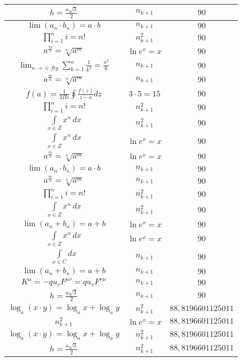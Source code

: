 \documentclass{article}
\begin{document}
\begin{flushleft}
\begin{longtable}{|c|c|c|}
$h=\frac{a\sqrt{3}}{2}$ & $n_{k+1}$ & $90$ \\ \hline 
$\lim\left(a_n\cdot b_n\right)=a\cdot b$ & $n_{k+1}$ & $90$ \\ \hline 
$\prod_{i=1}^ni=n!$ & $n_{k+1}^2$ & $90$ \\ \hline 
$a^{\frac{m}{n}}=\sqrt[n]{a^{m}}$ & $\ln e^x=x$ & $90$ \\ \hline 
$\lim_{n\to\in fty}\sum_{k=1}^n\frac{1}{k^2}=\frac{\pi^2}{6}$ & $n_{k+1}$ & $90$ \\ \hline 
$a^{\frac{m}{n}}=\sqrt[n]{a^{m}}$ & $n_{k+1}$ & $90$ \\ \hline 
$f\left(a\right)=\frac{1}{2\Pi i}\oint\frac{f\left(z\right)}{z-a}dz$ & $3\cdot 5=15$ & $90$ \\ \hline 
$\prod_{i=1}^ni=n!$ & $n_{k+1}^2$ & $90$ \\ \hline 
$\int \limits_{x\in Z}\!x^{n}\,dx$ & $n_{k+1}^2$ & $90$ \\ \hline 
$\int \limits_{x\in Z}\!x^{n}\,dx$ & $\ln e^x=x$ & $90$ \\ \hline 
$a^{\frac{m}{n}}=\sqrt[n]{a^{m}}$ & $\ln e^x=x$ & $90$ \\ \hline 
$\lim\left(a_n\cdot b_n\right)=a\cdot b$ & $n_{k+1}$ & $90$ \\ \hline 
$a^{\frac{m}{n}}=\sqrt[n]{a^{m}}$ & $n_{k+1}$ & $90$ \\ \hline 
$\prod_{i=1}^ni=n!$ & $n_{k+1}^2$ & $90$ \\ \hline 
$\int \limits_{x\in Z}\!x^{n}\,dx$ & $n_{k+1}^2$ & $90$ \\ \hline 
$\lim\left(a_n+b_n\right)=a+b$ & $\ln e^x=x$ & $90$ \\ \hline 
$\int \limits_{x\in Z}\!x^{n}\,dx$ & $\ln e^x=x$ & $90$ \\ \hline 
$\int \limits_{x\in C}dx$ & $n_{k+1}$ & $90$ \\ \hline 
$\lim\left(a_n+b_n\right)=a+b$ & $n_{k+1}$ & $90$ \\ \hline 
$K^\mu=-qu_vF^{\mu\nu}=qu_vF^{\nu\mu}$ & $n_{k+1}$ & $90$ \\ \hline 
$h=\frac{a\sqrt{3}}{2}$ & $n_{k+1}$ & $90$ \\ \hline 
$\log_{a}(x\cdot y)=\log_{a}x+\log_{a}y$ & $n_{k+1}^2$ & $88,8196601125011$ \\ \hline 
$n_{k+1}^2$ & $\ln e^x=x$ & $88,8196601125011$ \\ \hline 
$\log_{a}(x\cdot y)=\log_{a}x+\log_{a}y$ & $n_{k+1}^2$ & $88,8196601125011$ \\ \hline 
$h=\frac{a\sqrt{3}}{2}$ & $n_{k+1}^2$ & $88,8196601125011$ \\ \hline 

\end{longtable}
\end{flushleft}
\end{document}
